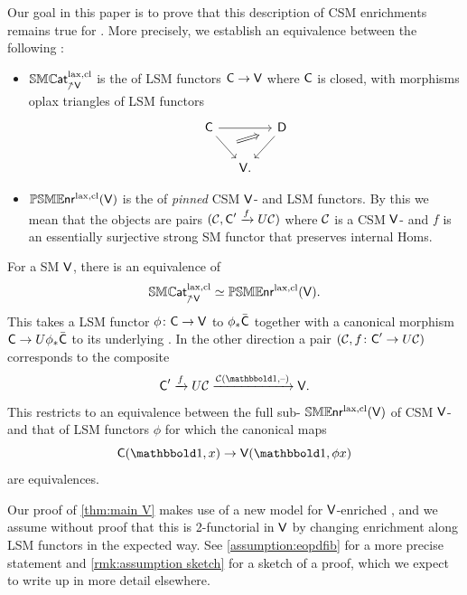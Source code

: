 \documentclass[a4paper,11pt]{article}
\newcommand{\SM}{SM}
\newcommand{\LSM}{LSM}
\newcommand{\CSM}{CSM}
\begin{document}
Our goal in this paper is to prove that this description of \CSM{} enrichments remains true for \icats{}. More
precisely, we establish an equivalence between the following
\itcats{}:
\begin{itemize}
\item $\SMCATlcl_{\upslash \oV}$ is the \itcat{} of \LSM{}
  functors $\oC \to \oV$ where $\textup{\textsf{C}}$ is closed, with morphisms oplax
  triangles of \LSM{} functors
    \[
    \begin{tikzcd}[column sep=small]
     \oC \ar[rr] \ar[dr, ""{name=A}] & & \oD \ar[dl] \\
     & \oV.
     \arrow[from=A,to=1-3,Rightarrow,shorten <=4pt, shorten >=10pt]
    \end{tikzcd}
  \]
\item $\mathbb{PSME}\mkern-0.5mu\textsf{\textup{nr}}^{\text{\textup{lax}},\text{\textup{cl}}}(\textup{\textsf{V}})$ is the \itcat{} of \emph{pinned} \CSM{} $\textup{\textsf{V}}$-\icats{} and \LSM{}
  functors. By this we mean that the objects are pairs $(\eC, \oC' \xto{f} U\eC)$
  where $\mathcal{C}$ is a \CSM{} $\textup{\textsf{V}}$-\icat{} and $f$ is
  an essentially surjective strong \SM{} functor that
  preserves internal Homs.
\end{itemize}
\begin{theoremint}\label{thm:main V}
  For a  \SM{} \icat{} $\textup{\textsf{V}}$, there is an equivalence of \itcats{}
  \[ \SMCATlcl_{\upslash \oV} \simeq \PSMENRlcl(\oV). \]
  This takes a \LSM{} functor $\phi \colon \oC \to
  \oV$ to $\phi_{*}\bar{\textup{\textsf{C}}}$ together with a canonical morphism $\oC
  \to U\phi_{*}\bar{\oC}$ to its underlying \icat{}. In the other
  direction a pair $(\eC, f \colon \oC' \to U\eC)$ corresponds to the
  composite
  \[ \oC' \xto{f} U\eC \xto{\eC(\bbone,\blank)} \oV.\]
  This restricts to an equivalence between the full sub-\itcat{} 
  $\mathbb{SME}\mkern-0.5mu\textsf{\textup{nr}}^{\text{\textup{lax}},\text{\textup{cl}}}(\textup{\textsf{V}})$ of \CSM{} $\textup{\textsf{V}}$-\icats{} and
  that of \LSM{} functors $\phi$ for which the
  canonical maps
  \[ \oC(\bbone,x) \to \oV(\bbone, \phi x)\]
  are equivalences.
\end{theoremint}
  
\begin{warning*}
  Our proof of \cref{thm:main V} makes use of a new model for
  $\textup{\textsf{V}}$-enriched \iopds{}, and we assume without proof that this is
  2-functorial in $\textup{\textsf{V}}$ by changing enrichment along \LSM{} functors
  in the expected way. See \cref{assumption:eopdfib} for a more
  precise statement and \cref{rmk:assumption sketch} for a sketch of a
  proof, which we expect to write up in more detail elsewhere.
\end{warning*}  
\end{document}
